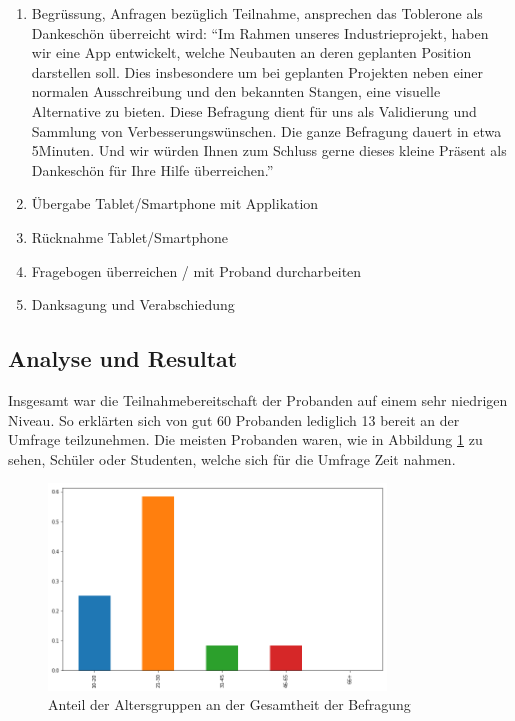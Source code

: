 \documentclass[a4paper]{scrreprt}
\begin{document}
\begin{enumerate}
	\item Begrüssung, Anfragen bezüglich Teilnahme, ansprechen das Toblerone als Dankeschön überreicht wird:
	\textquotedblleft Im Rahmen unseres Industrieprojekt, haben wir eine App entwickelt, welche Neubauten an deren geplanten Position darstellen soll. Dies insbesondere um bei geplanten Projekten neben einer normalen Ausschreibung und den bekannten Stangen, eine visuelle Alternative zu bieten. Diese Befragung dient für uns als Validierung und Sammlung von Verbesserungswünschen.
	Die ganze Befragung dauert in etwa 5Minuten. Und wir würden Ihnen zum Schluss gerne dieses kleine Präsent als Dankeschön für Ihre Hilfe überreichen.\textquotedblright
	\item Übergabe Tablet/Smartphone mit Applikation
	\item Rücknahme Tablet/Smartphone
	\item Fragebogen überreichen / mit Proband durcharbeiten
	\item Danksagung und Verabschiedung
\end{enumerate}

\subsection{Analyse und Resultat}

Insgesamt war die Teilnahmebereitschaft der Probanden auf einem sehr niedrigen Niveau. So erklärten sich von gut 60 Probanden lediglich 13 bereit an der Umfrage teilzunehmen. Die meisten Probanden waren, wie in Abbildung \ref{fig:Altersgruppen} zu sehen, Schüler oder Studenten, welche sich für die Umfrage Zeit nahmen.

\begin{figure}[htb]
	\centering
	\includegraphics[keepaspectratio, width=0.8\textwidth]{Altersgruppen.png}
	\caption{Anteil der Altersgruppen an der Gesamtheit der Befragung}
	\label{fig:Altersgruppen}
\end{figure}
\end{document}
